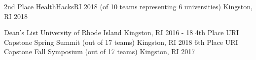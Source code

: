\graduateheader
\begin{cvhonors}
  \cvhonor
    {2nd Place}
    {HealthHacksRI 2018 (of 10 teams representing 6 universities)}
    {Kingston, RI}
    {2018}
\end{cvhonors}

\ugradheader
\begin{cvhonors}
  \cvhonor
    {Dean's List}
    {University of Rhode Island}
    {Kingston, RI}
    {2016 - 18}
  \cvhonor
    {4th Place}
    {URI Capstone Spring Summit (out of 17 teams)}
    {Kingston, RI}
    {2018}
  \cvhonor
    {6th Place}
    {URI Capstone Fall Symposium (out of 17 teams)}
    {Kingston, RI}
    {2017}
\end{cvhonors}

